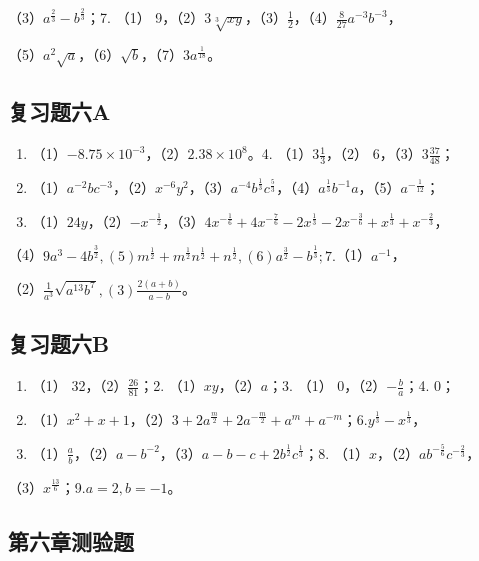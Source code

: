 （3）\(a^{\frac{2}{3}} - b^{\frac{2}{3}}\)；7. （1）
9，（2）\(3\sqrt[3]{xy}\)，（3）\(\frac{1}{2}\)，（4）\(\frac{8}{27} a^{-3}b^{-3}\)，

（5）\(a^2\sqrt{a}\)，（6）\(\sqrt{b}\)，（7）\(3a^{\frac{1}{18}}\)。

\subsection{复习题六A}

\begin{enumerate}[start=3]
\item
  （1）\(-8.75 \times 10^{-3}\)，（2）\(2.38 \times 10^{8}\)。4.
  （1）\(3\frac{1}{3}\)，（2） 6，（3）\(3\frac{37}{48}\)；
\item
  （1）\(a^{-2}bc^{-3}\)，（2）\(x^{-6}y^{2}\)，（3）\(a^{-4}b^{\frac{1}{3}}c^{\frac{5}{3}}\)，（4）\(a^{\frac{1}{3}}b^{-1}a\)，（5）\(a^{-\frac{1}{12}}\)；
\item
  （1）\(24y\)，（2）\(-x^{-\frac{1}{2}}\)，（3）\(4x^{-\frac{1}{6}} + 4x^{-\frac{7}{6}} - 2x^{\frac{1}{3}} - 2x^{-\frac{3}{6}} + x^{\frac{1}{3}} + x^{-\frac{2}{3}}\)，
\end{enumerate}

（4）\(9a^{3} - 4b^{\frac{3}{2}}, (5)m^{\frac{1}{2}} + m^{\frac{1}{2}}n^{\frac{1}{2}} + n^{\frac{1}{2}}, (6)a^{\frac{3}{2}} - b^{\frac{1}{3}}; 7.\)（1）\(a^{-1}\)，

（2）\(\frac{1}{a^3}\sqrt{a^{13}b^7}, (3)\frac{2(a + b)}{a - b}\)。

\subsection{复习题六B}

\begin{enumerate}
\item
  （1） 32，（2）\(\frac{26}{81}\)；2. （1）\(xy\)，（2）\(a\)；3. （1）
  0，（2）\(-\frac{b}{a}\)；4. 0；
\item
  （1）\(x^{2} + x + 1\)，（2）\(3 + 2a^{\frac{m}{2}} + 2a^{-\frac{m}{2}} + a^{m} + a^{-m}\)；6.\(y^{\frac{1}{3}} - x^{\frac{1}{3}}\)，
\item
  （1）\(\frac{a}{b}\)，（2）\(a - b^{-2}\)，（3）\(a - b - c + 2b^{\frac{1}{2}}c^{\frac{1}{3}}\)；8.
  （1）\(x\)，（2）\(ab^{-\frac{5}{6}}c^{-\frac{2}{3}}\)，
\end{enumerate}

（3）\(x^{\frac{13}{6}}\)；9.\(a = 2, b = -1\)。

\subsection{第六章测验题}

